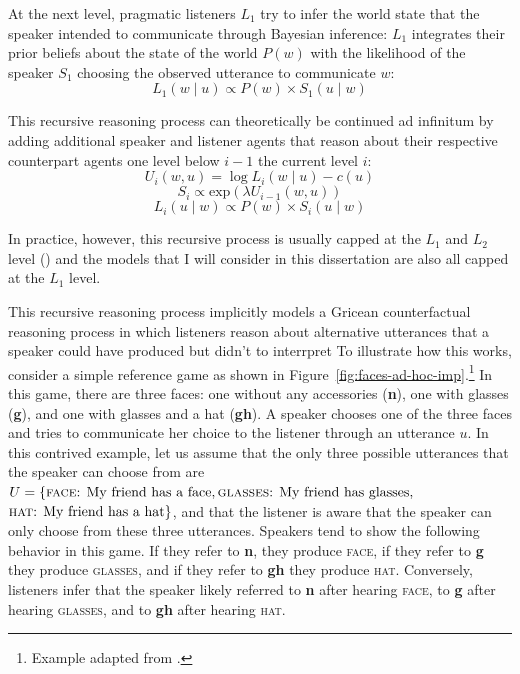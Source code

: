 At the next level, pragmatic listeners $L_1$ try to infer the world state that the speaker intended to communicate
through Bayesian inference: $L_1$ integrates their prior beliefs about the state of the world $P(w)$ with the likelihood
of the speaker $S_1$ choosing the observed utterance to communicate $w$:
$$L_1(w \mid u) \propto P(w) \times S_1(u \mid w)$$

This recursive reasoning process can theoretically be continued ad infinitum by adding additional speaker and listener agents that 
reason about their respective counterpart agents one level below $i-1$ the current level $i$:
$$U_i(w,u) = \log L_{i}(w \mid u) - c(u)$$
$$S_i \propto \mbox{exp} \left( \lambda U_{i-1}(w,u) \right)$$
$$ L_i(u \mid w) \propto P(w) \times S_i(u \mid w)$$

In practice, however, this recursive process is usually capped at the $L_1$ and $L_2$ level () and the models
that I will consider in this dissertation are also all capped at the $L_1$ level.



This recursive reasoning process implicitly models a Gricean counterfactual reasoning process in which listeners reason about alternative utterances
that a speaker could have produced but didn't to interrpret To illustrate how this works, consider a simple reference game as shown in Figure~\ref{fig:faces-ad-hoc-imp}.\footnote{Example adapted from \cite{GoodmanFrank2016}.} In this game,
there are three faces: one without any accessories (\textbf{n}), one with glasses (\textbf{g}), and one with glasses and a hat (\textbf{gh}). A speaker chooses one of the three faces
and tries to communicate her choice to the listener through an utterance $u$. In this contrived example, let us assume that the only three possible utterances that the
speaker can choose from are $U=\{\mbox{\textsc{face}: My friend has a face},\mbox{\textsc{glasses}: My friend has glasses},$ $\mbox{\textsc{hat}: My friend has a hat}\}$, 
and that the listener is aware that the speaker can only choose from these three utterances. Speakers tend to show the following behavior in this game. If they refer
to \textbf{n}, they produce \textsc{face}, if they refer to \textbf{g}  they produce \textsc{glasses}, and if they refer to \textbf{gh} they produce \textsc{hat}. Conversely, listeners infer that 
the speaker likely referred to \textbf{n} after hearing \textsc{face}, to \textbf{g}  after hearing \textsc{glasses}, and to \textbf{gh} after hearing \textsc{hat}.

